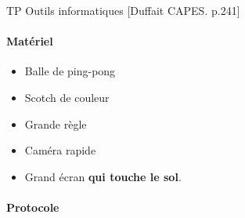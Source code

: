 \documentclass[11pt]{report}
\numberwithin{figure}{section}
\numberwithin{equation}{section}
\numberwithin{table}{section}
\newcommand{\1}{\boldsymbol{1}}
\begin{document}
\textcolor{mycolor5}{TP Outils informatiques} [Duffait CAPES. p.241] 

\begin{tcolorbox}[breakable, enhanced, colback=red!2!white,colframe=mycolor!85!black,title=\textbf{\textbf{Expérience}}]
\paragraph*{Matériel}
\begin{itemize}
\item Balle de ping-pong
\item Scotch de couleur
\item Grande règle
\item Caméra rapide
\item Grand écran \textbf{qui touche le sol}.
\end{itemize}

\paragraph*{Protocole } 


\end{tcolorbox}
\end{document}
